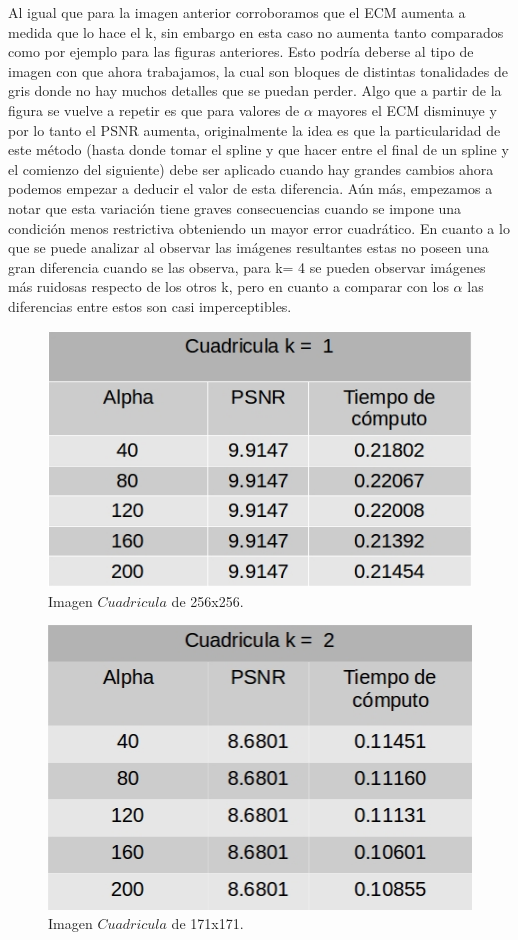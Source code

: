 \documentclass[a4paper]{article}
\begin{document}
    
Al igual que para la imagen anterior corroboramos que el ECM aumenta a medida que lo hace el k, sin embargo en esta caso no aumenta tanto comparados como por ejemplo para las figuras anteriores. Esto podría deberse al tipo de imagen con que ahora trabajamos, la cual son bloques de distintas tonalidades de gris donde no hay muchos detalles que se puedan perder. Algo que a partir de la figura se vuelve a repetir es que para valores de $\alpha$ mayores el ECM disminuye y por lo tanto el PSNR aumenta, originalmente la idea es que la particularidad de este método (hasta donde tomar el spline y que hacer entre el final de un spline y el comienzo del siguiente) debe ser aplicado cuando hay grandes cambios ahora podemos empezar a deducir el valor de esta diferencia. Aún más, empezamos a notar que esta variación tiene graves consecuencias cuando se impone una condición menos restrictiva  obteniendo un mayor error cuadrático. En cuanto a lo que se puede analizar al observar las imágenes resultantes estas no poseen una gran diferencia cuando se las observa, para k= 4 se pueden observar imágenes más ruidosas respecto de los otros k, pero en cuanto a comparar con los $\alpha$ las diferencias entre estos son casi imperceptibles.              
    

\begin{figure}[H]
    \centering
    \includegraphics[scale=0.4]{imagenes/cua1.jpg}
    \caption{Imagen $Cuadricula$ de 256x256.}
	\label{cuade1}
    \end{figure}
    
\begin{figure}[H]
    \centering
    \includegraphics[scale=0.4]{imagenes/cua2.jpg}
    \caption{Imagen $Cuadricula$ de 171x171.}
	\label{cuade2}
    \end{figure}
    
\end{document}
